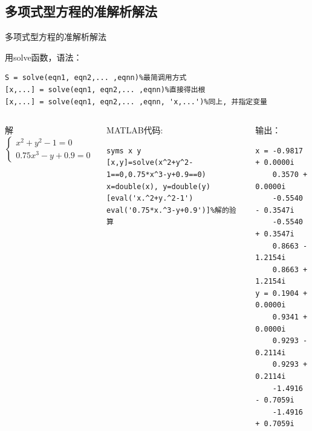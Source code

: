 \documentclass[12pt]{beamer}
\begin{document}
	\subsection{多项式型方程的准解析解法}
		\begin{frame}[fragile]{多项式型方程的准解析解法}
		\begin{block}{用solve函数，语法：}
\begin{lstlisting}
S = solve(eqn1, eqn2,... ,eqnn)%最简调用方式
[x,...] = solve(eqn1, eqn2,... ,eqnn)%直接得出根
[x,...] = solve(eqn1, eqn2,... ,eqnn, 'x,...')%同上, 并指定变量
\end{lstlisting}
		\end{block}	  
		\begin{columns}[T]
		\begin{example}[6-4]
			解$\left\{\begin{array}{l}
			x^{2}+y^{2}-1=0 \\
			0.75 x^{3}-y+0.9=0
			\end{array}\right.$
		\end{example}
	\begin{block}{MATLAB代码:}
\begin{lstlisting}
syms x y
[x,y]=solve(x^2+y^2-1==0,0.75*x^3-y+0.9==0)
x=double(x), y=double(y)
[eval('x.^2+y.^2-1') eval('0.75*x.^3-y+0.9')]%解的验算
\end{lstlisting}
	\end{block}
		\begin{block}{输出：}
\begin{lstlisting}
x = -0.9817 + 0.0000i
    0.3570 + 0.0000i
    -0.5540 - 0.3547i
    -0.5540 + 0.3547i
    0.8663 - 1.2154i
    0.8663 + 1.2154i
y = 0.1904 + 0.0000i
    0.9341 + 0.0000i
    0.9293 - 0.2114i
    0.9293 + 0.2114i
    -1.4916 - 0.7059i
    -1.4916 + 0.7059i
\end{lstlisting}	
		\end{block}			
	\end{columns}
		\end{frame}
\end{document}
